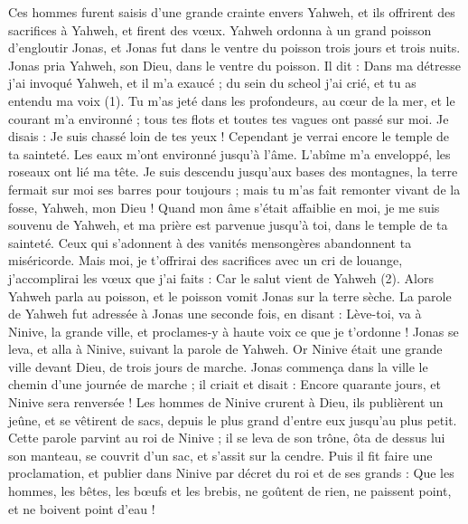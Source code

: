 \begin{multicols}{2}
Ces hommes furent saisis d’une grande crainte envers Yahweh, et ils offrirent des sacrifices à Yahweh, et firent des vœux.
Yahweh ordonna à un grand poisson d’engloutir Jonas, et Jonas fut dans le ventre du poisson trois jours et trois nuits.
\VerseOne{}Jonas pria Yahweh, son Dieu, dans le ventre du poisson.
Il dit : Dans ma détresse j’ai invoqué Yahweh, et il m'a exaucé ; du sein du scheol j’ai crié, et tu as entendu ma voix (1).
Tu m'as jeté dans les profondeurs, au cœur de la mer, et le courant m'a environné ; tous tes flots et toutes tes vagues ont passé sur moi.
Je disais : Je suis chassé loin de tes yeux ! Cependant je verrai encore le temple de ta sainteté.
Les eaux m'ont environné jusqu'à l'âme. L'abîme m'a enveloppé, les roseaux ont lié ma tête.
Je suis descendu jusqu'aux bases des montagnes, la terre fermait sur moi ses barres pour toujours ; mais tu m’as fait remonter vivant de la fosse, Yahweh, mon Dieu !
Quand mon âme s’était affaiblie en moi, je me suis souvenu de Yahweh, et ma prière est parvenue jusqu’à toi, dans le temple de ta sainteté.
Ceux qui s’adonnent à des vanités mensongères abandonnent ta miséricorde.
Mais moi, je t’offrirai des sacrifices avec un cri de louange, j’accomplirai les vœux que j’ai faits : Car le salut vient de Yahweh (2).
Alors Yahweh parla au poisson, et le poisson vomit Jonas sur la terre sèche.
\VerseOne{}La parole de Yahweh fut adressée à Jonas une seconde fois, en disant :
Lève-toi, va à Ninive, la grande ville, et proclames-y à haute voix ce que je t'ordonne !
Jonas se leva, et alla à Ninive, suivant la parole de Yahweh. Or Ninive était une grande ville devant Dieu, de trois jours de marche.
Jonas commença dans la ville le chemin d'une journée de marche ; il criait et disait : Encore quarante jours, et Ninive sera renversée !
Les hommes de Ninive crurent à Dieu, ils publièrent un jeûne, et se vêtirent de sacs, depuis le plus grand d'entre eux jusqu'au plus petit.
Cette parole parvint au roi de Ninive ; il se leva de son trône, ôta de dessus lui son manteau, se couvrit d'un sac, et s'assit sur la cendre.
Puis il fit faire une proclamation, et publier dans Ninive par décret du roi et de ses grands : Que les hommes, les bêtes, les bœufs et les brebis, ne goûtent de rien, ne paissent point, et ne boivent point d'eau !

\end{multicols}
